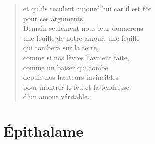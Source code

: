 \documentclass[11pt,a4paper]{book}
\begin{document}
\begin{verse}
et qu'ils reculent aujourd'hui car il est tôt \\
pour ces arguments. \\
Demain seulement nous leur donnerons \\
une feuille de notre amour, une feuille \\
qui tombera sur la terre, \\
comme si nos lèvres l'avaient faite, \\
comme un baiser qui tombe \\
depuis nos hauteurs invincibles \\
pour montrer le feu et la tendresse \\
d'un amour véritable.
\end{verse}

\cleardoublepage

\part{Épithalame}

\cleardoublepage
\end{document}

